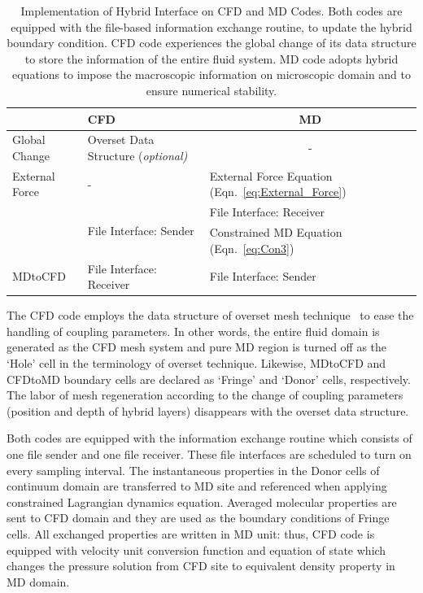 \documentclass[preprint,12pt]{elsarticle}
\begin{document}
\begin{table}
  \caption{\small Implementation of Hybrid Interface on CFD and MD Codes. Both codes are equipped with the file-based information exchange routine, to update the hybrid boundary condition. CFD code experiences the global change of its data structure to store the information of the entire fluid system. MD code adopts hybrid equations to impose the macroscopic information on microscopic domain and to ensure numerical stability.}
  \label{table:interface_implementation}
  \centering
\footnotesize
 \begin{tabular}{>{\centering}p{} || p{} | p{} }
\hline
  & \centering CFD & \multicolumn{1}{c}{MD} \\
\hline
 Global Change & Overset Data Structure (\it{optional}) & \multicolumn{1}{c}{-} \\
\hline
 \centering External Force & \centering - & External Force Equation (Eqn.~\ref{eq:External_Force}) \\
\hline
 \multirow{2}{*}{CFDtoMD} &  \multirow{2}{*}{File Interface: Sender} & {File Interface: Receiver} \\
 & & Constrained MD Equation (Eqn.~\ref{eq:Con3}) \\
\hline
 MDtoCFD & File Interface: Receiver & File Interface: Sender \\
\hline
\end{tabular} %
\vspace{-1em}
\end{table}


The CFD code employs the data structure of overset mesh technique~\cite{Chimera} to ease the handling of coupling parameters. In other words, the entire fluid domain is generated as the CFD mesh system and pure MD region is turned off as the `Hole' cell in the terminology of overset technique. Likewise, MDtoCFD and CFDtoMD boundary cells are declared as `Fringe' and `Donor' cells, respectively. The labor of mesh regeneration according to the change of coupling parameters (position and depth of hybrid layers) disappears with the overset data structure.

Both codes are equipped with the information exchange routine which consists of one file sender and one file receiver. These file interfaces are scheduled to turn on every sampling interval. The instantaneous properties in the Donor cells of continuum domain are transferred to MD site and referenced when applying constrained Lagrangian dynamics equation. Averaged molecular properties are sent to CFD domain and they are used as the boundary conditions of Fringe cells. All exchanged properties are written in MD unit: thus, CFD code is equipped with velocity unit conversion function and equation of state which changes the pressure solution from CFD site to equivalent density property in MD domain.
\end{document}
